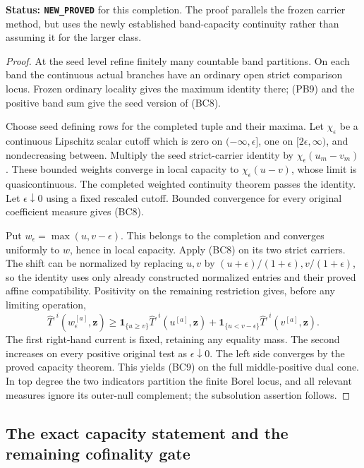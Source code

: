 \documentclass[11pt,a4paper]{article}
\numberwithin{equation}{section}
\theoremstyle{definition}
\theoremstyle{remark}
\begin{document}
\noindent\textbf{Status: \texttt{NEW\_PROVED}} for this completion.
The proof parallels the frozen carrier method, but uses the
newly established band-capacity continuity rather than assuming
it for the larger class.

\begin{proof}
At the seed level refine finitely many countable band partitions.
On each band the continuous actual branches have an ordinary
open strict comparison locus. Frozen ordinary locality gives
the maximum identity there; (PB9) and the positive band sum give
the seed version of (BC8).

Choose seed defining rows for the completed tuple and their
maxima. Let $\chi_\epsilon$ be a continuous Lipschitz scalar
cutoff which is zero on $(-\infty,\epsilon]$, one on
$[2\epsilon,\infty)$, and nondecreasing between. Multiply the
seed strict-carrier identity by
$\chi_\epsilon(u_m-v_m)$. These bounded weights converge in
local capacity to $\chi_\epsilon(u-v)$, whose limit is
quasicontinuous. The completed weighted continuity theorem
passes the identity. Let $\epsilon\downarrow0$ using a fixed
rescaled cutoff. Bounded convergence for every original
coefficient measure gives (BC8).

Put $w_\epsilon=\max(u,v-\epsilon)$. This belongs to the
completion and converges uniformly to $w$, hence in local
capacity. Apply (BC8) on its two strict carriers. The shift
can be normalized by replacing $u,v$ by
$(u+\epsilon)/(1+\epsilon),v/(1+\epsilon)$, so the identity
uses only already constructed normalized entries and their
proved affine compatibility. Positivity on the remaining
restriction gives, before any limiting operation,
\[
 \widehat T^{,i}(w_\epsilon^{[a]},\mathbf z)
 \geq\mathbf1_{\{u\geq v\}}\widehat T^{,i}(u^{[a]},\mathbf z)
       +\mathbf1_{\{u<v-\epsilon\}}\widehat T^{,i}(v^{[a]},\mathbf z).
\]
The first right-hand current is fixed, retaining any equality
mass. The second increases on every positive original test as
$\epsilon\downarrow0$. The left side converges by the proved
capacity theorem. This yields (BC9) on the full middle-positive
dual cone. In top degree the two indicators partition the
finite Borel locus, and all relevant measures ignore its
outer-null complement; the subsolution assertion follows.
\end{proof}

\subsection{The exact capacity statement and the remaining cofinality gate}
\end{document}
